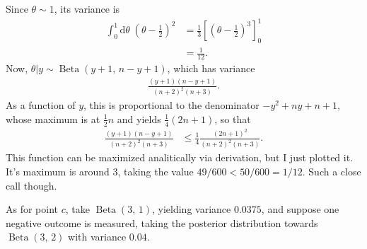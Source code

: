 \documentclass{article}
\newcommand\oname\operatorname
\begin{document}
Since $\theta\sim1$, its variance is
\begin{align*}
	\int_0^1\mathrm d\theta\;\left(\theta-\frac12\right)^2&=\frac13\left[\left(\theta-\frac12\right)^3\right]_0^1\\
	&=\frac1{12}.
\end{align*}
Now, $\theta|y\sim\oname{Beta}(y+1,\,n-y+1)$, which has variance
\begin{align*}
	\frac{(y+1)(n-y+1)}{(n+2)^2(n+3)}.
\end{align*}
As a function of $y$, this is proportional to the denominator $-y^2+ny+n+1$, whose maximum is at $\frac12n$ and yields $\frac14\left(2n+1\right)$, so that
\begin{align*}
	\frac{(y+1)(n-y+1)}{(n+2)^2(n+3)}&\leq\frac14\frac{\left(2n+1\right)^2}{\left(n+2\right)^2(n+3)}.
\end{align*}
This function can be maximized analitically via derivation, but I just plotted it. It's maximum is around $3$, taking the value $49/600<50/600=1/12$. Such a close call though.

As for point $c$, take $\oname{Beta}(3,\,1)$, yielding variance $0.0375$, and suppose one negative outcome is measured, taking the posterior distribution towards $\oname{Beta}(3,\,2)$ with variance $0.04$.
\end{document}

